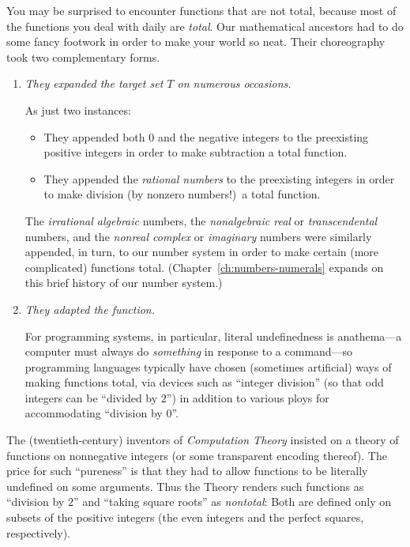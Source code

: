 
\medskip

You may be surprised to encounter functions that are not total, because most of the functions you deal with daily are {\em total}.  Our mathematical ancestors had to do some fancy footwork in order to make your world so neat.  Their choreography took two complementary forms.
\begin{enumerate}
\item
{\em They expanded the target set $T$ on numerous occasions.}

\smallskip

As just two instances:
  \begin{itemize}
  \item
They appended both $0$ and the negative integers to the preexisting positive integers in order to make subtraction a total function.

  \medskip\item
They appended the {\it rational numbers} to the preexisting integers in order to make division (by nonzero numbers!)~a total function.
  \end{itemize}
The {\it irrational algebraic} numbers, the {\it nonalgebraic real} or {\em transcendental} numbers, and the {\it nonreal complex} or {\em imaginary} numbers were similarly appended, in turn, to our number system in order to make certain (more complicated) functions total.  (Chapter~\ref{ch:numbers-numerals} expands on this brief history of our number system.)

\medskip\item
{\em They adapted the function.}

\smallskip

For programming systems, in particular, literal undefinedness is anathema---a computer must always do {\em something} in response to a command---so programming languages typically have chosen (sometimes artificial) ways of making functions total, via devices such as ``integer division'' (so that odd integers can be ``divided by $2$'') in addition to various ploys for accommodating ``division by $0$''.
\end{enumerate}
The (twentieth-century) inventors of {\em Computation Theory} insisted on a theory of functions on nonnegative integers (or some transparent encoding thereof).  The price for such ``pureness'' is that they had to allow functions to be literally undefined on some arguments.  Thus the Theory renders such functions as ``division by $2$'' and ``taking square roots'' as {\em nontotal}: Both are defined only on subsets of the positive integers (the even integers and the perfect squares, respectively).


